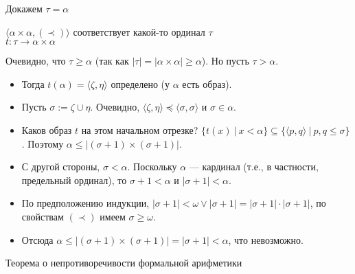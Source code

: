 \documentclass[aspectratio=169]{beamer}
\begin{document}
\begin{frame}{Докажем $\tau = \alpha$}

{\color{gray}
$\langle \alpha\times\alpha, (\prec)\rangle$ соответствует какой-то ординал $\tau$\\$t: \tau\rightarrow\alpha\times\alpha$
}\vspace{0.3cm}

Очевидно, что $\tau \ge \alpha$ (так как $|\tau| = |\alpha\times\alpha| \ge \alpha$). Но пусть $\tau > \alpha$.
\begin{itemize}
\item Тогда $t(\alpha) = \langle\zeta,\eta\rangle$ определено (у $\alpha$ есть образ).
\item Пусть $\sigma := \zeta \cup \eta$. Очевидно, $\langle \zeta, \eta \rangle \preceq \langle \sigma,\sigma \rangle$
и $\sigma \in \alpha$.
\item Каков образ $t$ на этом начальном отрезке?
$\{t(x)\ |\ x < \alpha\} \subseteq \{\langle p,q\rangle\ |\ p,q \le \sigma\}$.
Поэтому $\alpha \le |(\sigma+1)\times(\sigma+1)|$. 
\item С другой стороны, $\sigma < \alpha$. Поскольку $\alpha$ --- кардинал (т.е., в частности, предельный ординал), 
то $\sigma+1 < \alpha$ и $|\sigma+1| < \alpha$. 
\item По предположению индукции, $|\sigma+1|<\omega \vee |\sigma+1| = |\sigma+1|\cdot|\sigma+1|$,
по свойствам $(\prec)$ имеем $\sigma\ge\omega$.
\item Отсюда $\alpha \le |(\sigma+1)\times(\sigma+1)| = |\sigma+1| < \alpha$, что невозможно.
\end{itemize}


\end{frame}

\begin{frame}{}
\LARGE\begin{center}Теорема о непротиворечивости формальной арифметики\end{center}
\end{frame}
\end{document}
